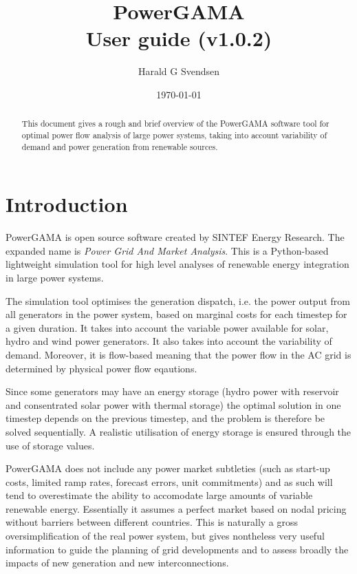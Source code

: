 \documentclass{article}
\title{PowerGAMA\\User guide (v1.0.2)}
\author{Harald G Svendsen}
\date{\today}
\begin{document}
\maketitle

\begin{abstract}
This document gives a rough and brief overview of the PowerGAMA software tool for optimal power flow analysis of large power systems, taking into account variability of demand and power generation from renewable sources.
\end{abstract}

\tableofcontents


\newpage
\section{Introduction}
PowerGAMA is open source software created by SINTEF Energy Research. The expanded name is \emph{Power Grid And Market Analysis}. This is a Python-based  lightweight simulation tool for high level analyses of renewable energy integration in large power systems.

The simulation tool optimises the generation dispatch, i.e. the power output from all generators in the power system, based on marginal costs for each timestep for a given duration.  It takes into account the variable power available for solar, hydro and wind power generators. It also takes into account the variability of demand. Moreover, it is flow-based meaning that the power flow in the AC grid is determined by physical power flow eqautions. 

Since some generators may have an energy storage (hydro power with reservoir and consentrated solar power with thermal storage) the optimal solution in one timestep depends on the previous timestep, and the problem is  therefore be solved sequentially.  A realistic utilisation of energy storage is ensured through the use of storage values.


PowerGAMA does not include any power market subtleties (such as start-up costs, limited ramp rates, forecast errors, unit commitments) and as such will tend to overestimate the ability to accomodate large amounts of variable renewable energy. Essentially it assumes a perfect market based on nodal pricing without barriers between different countries. This is naturally a gross oversimplification of the real power system, but gives nontheless very useful information to guide the planning of grid developments and to assess broadly the impacts of new generation and new interconnections.
\end{document}
